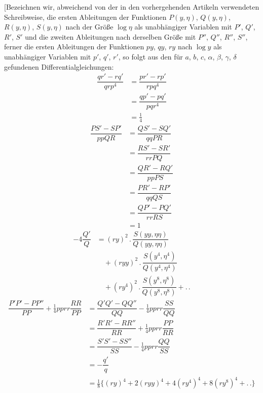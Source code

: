 [Bezeichnen wir, abweichend von der in den vorhergehenden Artikeln verwendeten Schreibweise, die ersten Ableitungen der Funktionen $P(y,\allowbreak \eta)$, $Q(y,\allowbreak \eta)$, $R(y,\allowbreak \eta)$, $S(y,\allowbreak \eta)$ nach der Größe $\log\eta$ als unabhängiger Variablen mit $P'$, $Q'$, $R'$, $S'$ und die zweiten Ableitungen nach derselben Größe mit $P''$, $Q''$, $R''$, $S''$, ferner die ersten Ableitungen der Funktionen $py$, $qy$, $ry$ nach $\log y$ als unabhängiger Variablen mit $p'$, $q'$, $r'$, so folgt aus den für $a$, $b$, $c$, $\alpha$, $\beta$, $\gamma$, $\delta$ gefundenen Differentialgleichungen:
\[
\begin{aligned}\dfrac{qr'-rq'}{qrp^4}&=\dfrac{pr'-rp'}{rpq^4}
 \\[7pt]&=\dfrac{qp'-pq'}{pqr^4}\\[7pt]&=\tfrac14\end{aligned}
\]
\[
\begin{aligned}\dfrac{PS'-SP'}{ppQR}&=\dfrac{QS'-SQ'}{qqPR}
 \\[7pt]&=\dfrac{RS'-SR'}{rrPQ}\\[7pt]&=\dfrac{QR'-RQ'}{ppPS}
 \\[7pt]&=\dfrac{PR'-RP'}{qqQS}\\[7pt]&=\dfrac{QP'-PQ'}{rrRS}\\[7pt]&=1\end{aligned}
\]
\[
\begin{aligned}-4\dfrac{Q'}Q&=(ry)^2\mathbin{.}\dfrac{S(yy,\eta\eta)}{Q(yy,\eta\eta)}\\[6pt]&\quad{}+
(ryy)^2\mathbin{.}\dfrac{S(y^4,\eta^4)}{Q(y^4,\eta^4)}\\[6pt]&\quad{}+
(ry^4)^2\mathbin{.}\dfrac{S(y^8,\eta^8)}{Q(y^8,\eta^8)}+\mathord{.}\,\mathord{.}\end{aligned}
\]
\[
\begin{aligned}
\dfrac{P'P'-PP''}{PP}+\tfrac14pprr\dfrac{RR}{PP}
 &=\dfrac{Q'Q'-QQ''}{QQ}-\tfrac14pprr\dfrac{SS}{QQ}
\\[8pt]&=\dfrac{R'R'-RR''}{RR}+\tfrac14pprr\dfrac{PP}{RR}
 \\[8pt]&=\dfrac{S'S'-SS''}{SS}-\tfrac14pprr\dfrac{QQ}{SS}
\\[8pt]&=-\dfrac{q'}q\\[8pt]&=\tfrac18\{(ry)^4+2(ryy)^4+4(ry^4)^4+8(ry^8)^4+\mathord{.}\,\mathord{.}\}
\end{aligned}
\]

